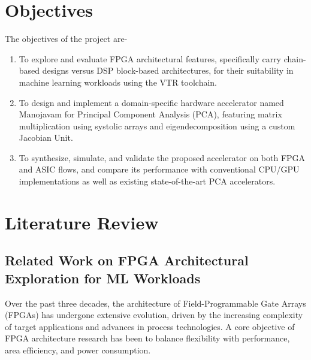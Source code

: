 \section[Objectives]{\textbf{Objectives}}
The objectives of the project are-
\begin{enumerate}
	\item To explore and evaluate FPGA architectural features, specifically carry chain-based designs versus DSP block-based architectures, for their suitability in machine learning workloads using the VTR toolchain.
	\item To design and implement a domain-specific hardware accelerator named Manojavam for Principal Component Analysis (PCA), featuring matrix multiplication using systolic arrays and eigendecomposition using a custom Jacobian Unit.
	\item To synthesize, simulate, and validate the proposed accelerator on both FPGA and ASIC flows, and compare its performance with conventional CPU/GPU implementations as well as existing state-of-the-art PCA accelerators.
\end{enumerate}

\section[Literature Review]{\textbf{Literature Review}}
\subsection{Related Work on FPGA Architectural Exploration for ML Workloads}
Over the past three decades, the architecture of Field-Programmable Gate Arrays (FPGAs) has undergone extensive evolution, driven by the increasing complexity of target applications and advances in process technologies. A core objective of FPGA architecture research has been to balance flexibility with performance, area efficiency, and power consumption.

